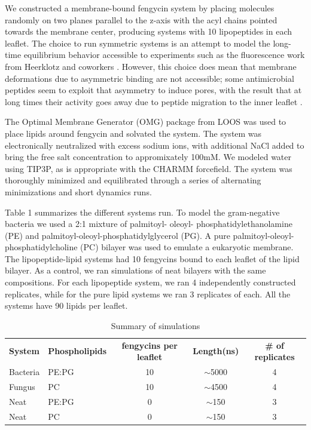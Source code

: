 We constructed a membrane-bound fengycin system by placing molecules randomly on
two planes parallel to the z-axis with the acyl chains pointed towards the
membrane center, producing systems with 10 lipopeptides in each leaflet. The
choice to run symmetric systems is an attempt to model the long-time equilibrium
behavior accessible to experiments such as the fluorescence work from Heerklotz
and coworkers \cite{Heerklotz2011}. However, this choice does mean that membrane
deformations due to asymmetric binding are not accessible; some antimicrobial
peptides seem to exploit that asymmetry to induce pores, with the result that at
long times their activity goes away due to peptide migration to the inner
leaflet \cite{Wimley2012}.

The Optimal Membrane Generator (OMG) package from LOOS was used to place lipids
around fengycin and solvated the system.\cite{Grossfield2009,Grossfield2015} The
system was electronically neutralized with excess sodium ions, with additional
NaCl added to bring the free salt concentration to appromixately 100mM. We
modeled water using TIP3P, as is appropriate with the CHARMM forcefield. The
system was thoroughly minimized and equilibrated through a series of alternating
minimizations and short dynamics runs.

Table 1 summarizes the different systems run. To model the gram-negative
bacteria we used a 2:1 mixture of
palmitoyl- oleoyl- phosphatidylethanolamine (PE)
and palmitoyl-oleoyl-phosphatidylglycerol (PG). A pure palmitoyl-oleoyl-phosphatidylcholine
(PC) bilayer was used to emulate a eukaryotic membrane. The
lipopeptide-lipid systems had 10 fengycins bound to each leaflet of the lipid
bilayer. As a control, we ran simulations of neat bilayers with the same
compositions. For each lipopeptide system, we ran 4 independently constructed
replicates, while for the pure lipid systems we ran 3 replicates of each. All
the systems have 90 lipids per leaflet.

\begin{table}
  \caption{Summary of simulations}
  \label{tbl:ch2_sys_cons}
  \begin{tabular}{llccc}
    \hline
    \textbf{System}  & \textbf{Phospholipids} & \textbf{fengycins per leaflet} & \textbf{Length(ns)} & \textbf{\# of replicates} \\
    Bacteria   & PE:PG & 10 & $\sim$5000  & 4 \\
    Fungus & PC  & 10 & $\sim$4500 & 4\\
    Neat  & PE:PG & 0 & $\sim$150 & 3\\
    Neat & PC & 0 & $\sim$150 &3\\
    \hline
  \end{tabular}
\end{table}

